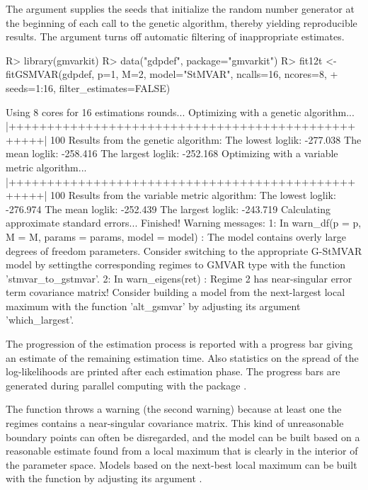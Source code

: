 \documentclass[nojss]{jss}
\begin{document}
The argument  supplies the seeds that initialize the random number generator at the beginning of each call to the genetic algorithm, thereby yielding reproducible results. The argument  turns off automatic filtering of inappropriate estimates.
%
\begin{CodeChunk}
\begin{CodeInput}
R> library(gmvarkit)
R> data("gdpdef", package="gmvarkit")
R> fit12t <- fitGSMVAR(gdpdef, p=1, M=2, model="StMVAR", ncalls=16, ncores=8,
+    seeds=1:16, filter_estimates=FALSE)
\end{CodeInput}
\begin{CodeOutput}
Using 8 cores for 16 estimations rounds...
Optimizing with a genetic algorithm...
  |++++++++++++++++++++++++++++++++++++++++++++++++++| 100%
Results from the genetic algorithm:
The lowest loglik:  -277.038
The mean loglik:    -258.416
The largest loglik: -252.168
Optimizing with a variable metric algorithm...
  |++++++++++++++++++++++++++++++++++++++++++++++++++| 100%
Results from the variable metric algorithm:
The lowest loglik:  -276.974
The mean loglik:    -252.439
The largest loglik: -243.719
Calculating approximate standard errors...
Finished!
Warning messages:
1: In warn_df(p = p, M = M, params = params, model = model) :
  The model contains overly large degrees of freedom parameters. Consider
  switching to the appropriate G-StMVAR model by settingthe corresponding
  regimes to GMVAR type with the function 'stmvar_to_gstmvar'.
2: In warn_eigens(ret) :
  Regime 2 has near-singular error term covariance matrix! Consider building
  a model from the next-largest local maximum with the function 'alt_gsmvar'
  by adjusting its argument 'which_largest'.
\end{CodeOutput}
\end{CodeChunk}
%
The progression of the estimation process is reported with a progress bar giving an estimate of the remaining estimation time. Also statistics on the spread of the log-likelihoods are printed after each estimation phase. The progress bars are generated during parallel computing with the package  \citep{Solymos+Zawadzki:2020}.

The function throws a warning (the second warning) because at least one the regimes contains a near-singular covariance matrix. This kind of unreasonable boundary points can often be disregarded, and the model can be built based on a reasonable estimate found from a local maximum that is clearly in the interior of the parameter space. Models based on the next-best local maximum can be built with the function  by adjusting its argument .
\end{document}
